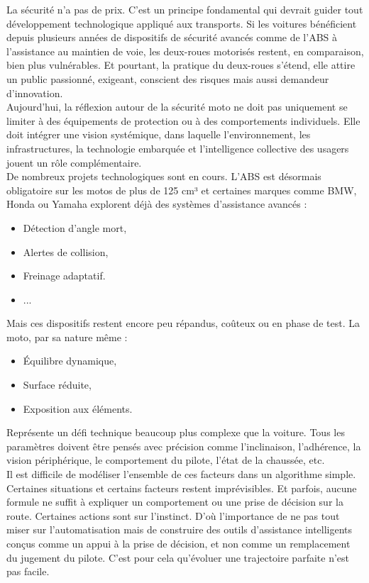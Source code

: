 La sécurité n’a pas de prix. C’est un principe fondamental qui devrait guider tout développement technologique appliqué aux transports. Si les voitures bénéficient depuis plusieurs années de dispositifs de sécurité avancés comme de l’ABS à l’assistance au maintien de voie, les deux-roues motorisés restent, en comparaison, bien plus vulnérables. Et pourtant, la pratique du deux-roues s’étend, elle attire un public passionné, exigeant, conscient des risques mais aussi demandeur d’innovation.\\
Aujourd’hui, la réflexion autour de la sécurité moto ne doit pas uniquement se limiter à des équipements de protection ou à des comportements individuels. Elle doit intégrer une vision systémique, dans laquelle l’environnement, les infrastructures, la technologie embarquée et l’intelligence collective des usagers jouent un rôle complémentaire.\\
De nombreux projets technologiques sont en cours. L’ABS est désormais obligatoire sur les motos de plus de 125 cm³ et certaines marques comme BMW, Honda ou Yamaha explorent déjà des systèmes d’assistance avancés : 
\begin{itemize}
	\item Détection d’angle mort,
	\item Alertes de collision,
	\item Freinage adaptatif.
	\item ...
\end{itemize}
Mais ces dispositifs restent encore peu répandus, coûteux ou en phase de test. La moto, par sa nature même :
\begin{itemize}
	\item Équilibre dynamique,
	\item Surface réduite,
	\item Exposition aux éléments.
\end{itemize}
Représente un défi technique beaucoup plus complexe que la voiture. Tous les paramètres doivent être pensés avec précision comme l'inclinaison, l'adhérence, la vision périphérique, le comportement du pilote, l'état de la chaussée, etc.\\
Il est difficile de modéliser l’ensemble de ces facteurs dans un algorithme simple. Certaines situations et certains facteurs restent imprévisibles. Et parfois, aucune formule ne suffit à expliquer un comportement ou une prise de décision sur la route. Certaines actions sont sur l'instinct. D’où l’importance de ne pas tout miser sur l’automatisation mais de construire des outils d’assistance intelligents conçus comme un appui à la prise de décision, et non comme un remplacement du jugement du pilote. C'est pour cela qu'évoluer une trajectoire parfaite n'est pas facile.\\
